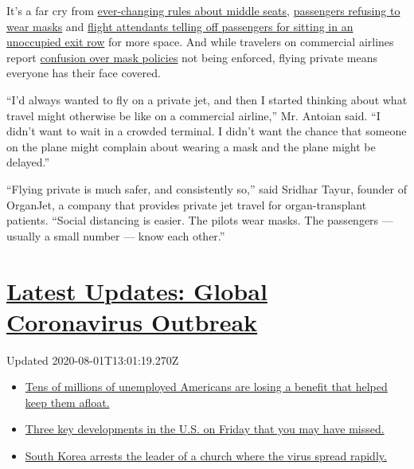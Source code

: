 It's a far cry from
\href{https://www.nytimes.com/2020/07/10/world/canada/canada-airlines-coronavirus.html}{ever-changing
rules about middle seats},
\href{https://www.nytimes.com/2020/06/18/us/american-airlines-mask-brandon-straka.html}{passengers
refusing to wear masks} and
\href{https://www.nytimes.com/2020/07/08/travel/airplanes-social-distancing-coronavirus.html}{flight
attendants telling off passengers for sitting in an unoccupied exit row}
for more space. And while travelers on commercial airlines report
\href{https://www.nytimes.com/2020/06/04/travel/coronavirus-flying-face-masks.html}{confusion
over mask policies} not being enforced, flying private means everyone
has their face covered.

``I'd always wanted to fly on a private jet, and then I started thinking
about what travel might otherwise be like on a commercial airline,'' Mr.
Antoian said. ``I didn't want to wait in a crowded terminal. I didn't
want the chance that someone on the plane might complain about wearing a
mask and the plane might be delayed.''

``Flying private is much safer, and consistently so,'' said Sridhar
Tayur, founder of OrganJet, a company that provides private jet travel
for organ-transplant patients. ``Social distancing is easier. The pilots
wear masks. The passengers --- usually a small number --- know each
other.''

\hypertarget{latest-updates-global-coronavirus-outbreak}{%
\section{\texorpdfstring{\href{https://www.nytimes.com/2020/08/01/world/coronavirus-covid-19.html?action=click\&pgtype=Article\&state=default\&region=MAIN_CONTENT_1\&context=storylines_live_updates}{Latest
Updates: Global Coronavirus
Outbreak}}{Latest Updates: Global Coronavirus Outbreak}}\label{latest-updates-global-coronavirus-outbreak}}

Updated 2020-08-01T13:01:19.270Z

\begin{itemize}
\tightlist
\item
  \href{https://www.nytimes.com/2020/08/01/world/coronavirus-covid-19.html?action=click\&pgtype=Article\&state=default\&region=MAIN_CONTENT_1\&context=storylines_live_updates\#link-70fc13b1}{Tens
  of millions of unemployed Americans are losing a benefit that helped
  keep them afloat.}
\item
  \href{https://www.nytimes.com/2020/08/01/world/coronavirus-covid-19.html?action=click\&pgtype=Article\&state=default\&region=MAIN_CONTENT_1\&context=storylines_live_updates\#link-586d44ab}{Three
  key developments in the U.S. on Friday that you may have missed.}
\item
  \href{https://www.nytimes.com/2020/08/01/world/coronavirus-covid-19.html?action=click\&pgtype=Article\&state=default\&region=MAIN_CONTENT_1\&context=storylines_live_updates\#link-2b88e858}{South
  Korea arrests the leader of a church where the virus spread rapidly.}
\end{itemize}

